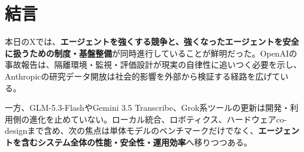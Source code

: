 \section*{結言}
本日のXでは、\textbf{エージェントを強くする競争と、強くなったエージェントを安全に扱うための制度・基盤整備}が同時進行していることが鮮明だった。OpenAIの事故報告は、隔離環境・監視・評価設計が現実の自律性に追いつく必要を示し、Anthropicの研究データ開放は社会的影響を外部から検証する経路を広げている。

一方、GLM-5.3-FlashやGemini 3.5 Transcribe、Grok系ツールの更新は開発・利用側の進化を止めていない。ローカル統合、ロボティクス、ハードウェアco-designまで含め、次の焦点は単体モデルのベンチマークだけでなく、\textbf{エージェントを含むシステム全体の性能・安全性・運用効率}へ移りつつある。
